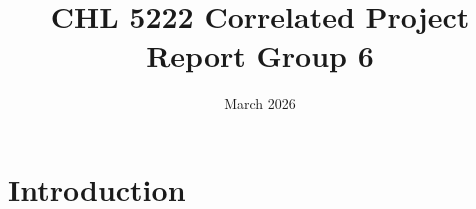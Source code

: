 \documentclass{article}
\title{CHL 5222 Correlated Project Report Group 6}
\author{ }
\date{March 2026}
\begin{document}
\maketitle

\section{Introduction}
\end{document}
